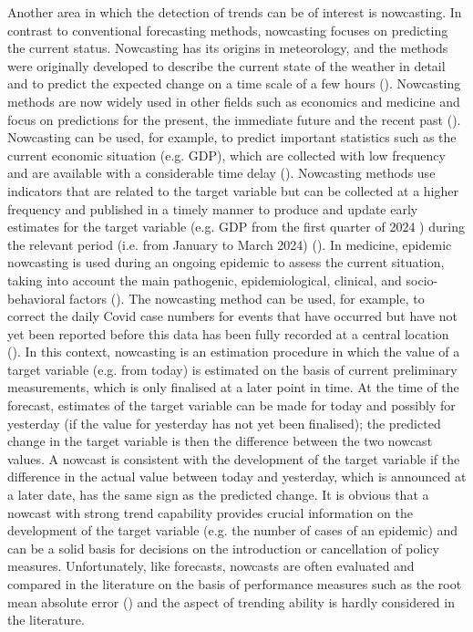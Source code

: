 Another area in which the detection of trends can be of interest is nowcasting.
In contrast to conventional forecasting methods, nowcasting focuses on predicting the current status.
Nowcasting has its origins in meteorology, and the methods were originally developed to describe the current state of the weather in detail and to predict the expected change on a time scale of a few hours (\cite{browning1989nowcasting,schmid2019nowcasting}).
Nowcasting methods are now widely used in other fields such as economics and medicine and focus on predictions for the present, the immediate future and the recent past (\cite{banbura2013now, bok2018macroeconomic}).
Nowcasting can be used, for example, to predict important statistics such as the current economic situation (e.g. GDP), which are collected with low frequency and are available with a considerable time delay (\cite{banbura2013now}).
Nowcasting methods use indicators that are related to the target variable but can be collected at a higher frequency and published in a timely manner to produce and update early estimates for the target variable (e.g. GDP from the first quarter of 2024 ) during the relevant period (i.e. from January to March 2024) (\cite{castle2017forecasting}). In medicine, epidemic nowcasting is used during an ongoing epidemic to assess the current situation, taking into account the main pathogenic, epidemiological, clinical, and socio-behavioral factors (\cite{wu2021nowcasting}). The nowcasting method can be used, for example, to correct the daily Covid case numbers for events that have occurred but have not yet been reported before this data has been fully recorded at a central location (\cite{gunther2021nowcasting}). In this context, nowcasting is an estimation procedure in which the value of a target variable (e.g. from today) is estimated on the basis of current preliminary measurements, which is only finalised at a later point in time. 
At the time of the forecast, estimates of the target variable can be made for today and possibly for yesterday (if the value for yesterday has not yet been finalised); the predicted change in the target variable is then the difference between the two nowcast values. A nowcast is consistent with the development of the target variable if the difference in the actual value between today and yesterday, which is announced at a later date, has the same sign as the predicted change. It is obvious that a nowcast with strong trend capability provides crucial information on the development of the target variable (e.g. the number of cases of an epidemic) and can be a solid basis for decisions on the introduction or cancellation of policy measures. Unfortunately, like forecasts, nowcasts are often evaluated and compared in the literature on the basis of performance measures such as the root mean absolute error (\cite{gunther2021nowcasting}) and the aspect of trending ability is hardly considered in the literature. 

